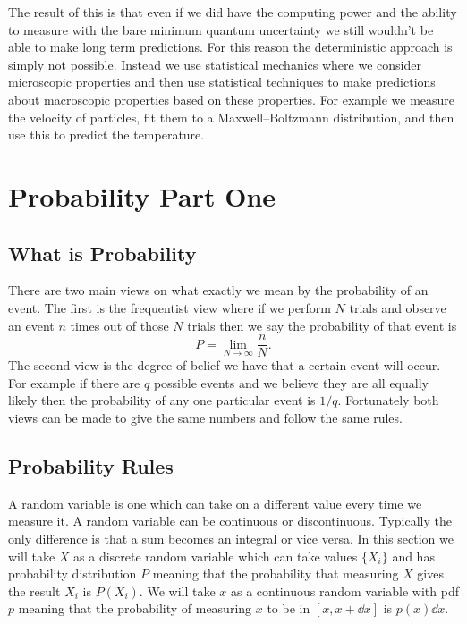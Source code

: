 \documentclass[a4paper]{article}
\begin{document}
    The result of this is that even if we did have the computing power and the ability to measure with the bare minimum quantum uncertainty we still wouldn't be able to make long term predictions.
    For this reason the deterministic approach is simply not possible.
    Instead we use statistical mechanics where we consider microscopic properties and then use statistical techniques to make predictions about macroscopic properties based on these properties.
    For example we measure the velocity of particles, fit them to a Maxwell--Boltzmann distribution, and then use this to predict the temperature.
    
    \section{Probability Part One}
    \subsection{What is Probability}
    There are two main views on what exactly we mean by the probability of an event.
    The first is the frequentist view where if we perform \(N\) trials and observe an event \(n\) times out of those \(N\) trials then we say the probability of that event is
    \[P = \lim_{N\to\infty}\frac{n}{N}.\]
    The second view is the degree of belief we have that a certain event will occur.
    For example if there are \(q\) possible events and we believe they are all equally likely then the probability of any one particular event is \(1/q\).
    Fortunately both views can be made to give the same numbers and follow the same rules.
    
    \subsection{Probability Rules}
    A random variable is one which can take on a different value every time we measure it.
    A random variable can be continuous or discontinuous.
    Typically the only difference is that a sum becomes an integral or vice versa.
    In this section we will take \(X\) as a discrete random variable which can take values \(\{X_i\}\) and has probability distribution \(P\) meaning that the probability that measuring \(X\) gives the result \(X_i\) is \(P(X_i)\).
    We will take \(x\) as a continuous random variable with \gls{pdf} \(p\) meaning that the probability of measuring \(x\) to be in \([x, x + \dd{x}]\) is \(p(x)\dd{x}\).
    
\end{document}
